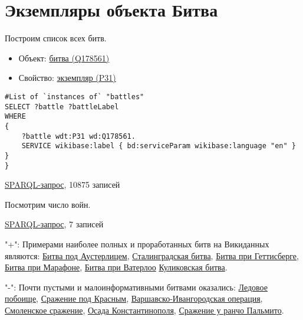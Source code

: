 \section{Экземпляры объекта Битва}
\begin{itemize}

Построим список всех битв.
\end{itemize}

\begin{itemize}
    \item Объект: \href{https://www.wikidata.org/wiki/Q178561}{битва (Q178561)}
    \item Свойство: \href{https://www.wikidata.org/wiki/Property:P31}{экземпляр (P31)}
\end{itemize}

\begin{lstlisting}[language=SPARQL  ]
#List of `instances of` "battles" 
SELECT ?battle ?battleLabel
WHERE
{
    ?battle wdt:P31 wd:Q178561.
    SERVICE wikibase:label { bd:serviceParam wikibase:language "en" }
}
}

\end{lstlisting}

\href{https://query.wikidata.org/#%23added%202017-02%0A%23List%20of%20%60instances%20of%60%20%22national%20park%22%20%0ASELECT%20%3Fbattle%20%3FbattleLabel%0AWHERE%0A%7B%0A%20%20%20%20%3Fbattle%20wdt%3AP31%20wd%3AQ178561.%0A%20%20%20%20SERVICE%20wikibase%3Alabel%20%7B%20bd%3AserviceParam%20wikibase%3Alanguage%20%22en%22%20%7D%0A%7D}{SPARQL-запрос}, 10875 записей

Посмотрим число войн.

\href{https://query.wikidata.org/#%23List%20of%20%60instances%20of%60%20%22war%22%20%0ASELECT%20%3Fwar%20%3FwarLabel%20WHERE%20%7B%0A%20%20%3Fwar%20wdt%3AP31%20wd%3AQ198.%0A%20%20SERVICE%20wikibase%3Alabel%20%7B%20bd%3AserviceParam%20wikibase%3Alanguage%20%22ru%22.%20%7D%0A%7D SPARQL-запрос}{SPARQL-запрос}, 7 записей


"+": Примерами наиболее полных и проработанных битв на Викиданных являются:
\href{https://www.wikidata.org/wiki/Q134114}{Битва под Аустерлицем}, 
\href{https://www.wikidata.org/wiki/Q38789}{Сталинградская битва},
\href{https://www.wikidata.org/wiki/Q33132}{Битва при Геттисберге},
\href{https://www.wikidata.org/wiki/Q31900}{Битва при Марафоне},
\href{https://www.wikidata.org/wiki/Q48314}{Битва при Ватерлоо}
\href{https://www.wikidata.org/wiki/Q210354}{Куликовская битва}.

"-": Почти пустыми и малоинформативными битвами оказались:
\href{https://www.wikidata.org/wiki/Q14689}{Ледовое побоище},
\href{https://www.wikidata.org/wiki/Q25809}{Сражение под Красным},
\href{https://www.wikidata.org/wiki/Q28205}{Варшавско-Ивангородская операция},
\href{https://www.wikidata.org/wiki/Q1071578}{Смоленское сражение},
\href{https://www.wikidata.org/wiki/Q27900}{Осада Константинополя},
\href{https://www.wikidata.org/wiki/Q48776}{Сражение у ранчо Пальмито}.